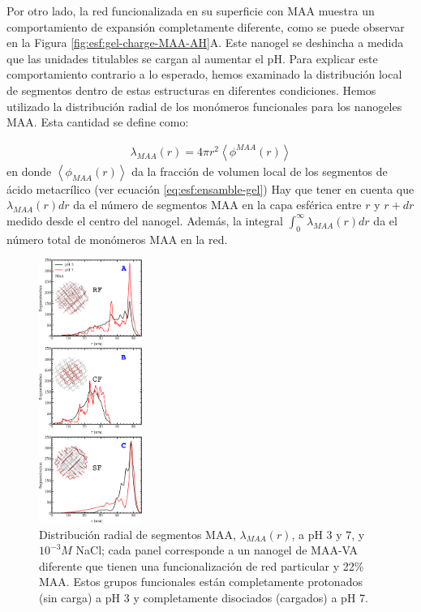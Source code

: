 Por otro lado, la red funcionalizada en su superficie con MAA muestra un comportamiento de expansi\'on completamente diferente, como se puede observar en la Figura \ref{fig:esf:gel-charge-MAA-AH}A. Este nanogel se deshincha a medida que las unidades titulables se cargan al aumentar el pH. Para explicar este comportamiento contrario a lo esperado, hemos examinado la distribuci\'on local de segmentos dentro de estas estructuras en diferentes condiciones. Hemos utilizado la distribuci\'on radial de los mon\'omeros funcionales para los nanogeles MAA. Esta cantidad se define como:



%
\begin{align}
    \lambda_{MAA}(r)= 4\pi r^2\left<\phi^{MAA}(r)\right>
\end{align}
%
\noindent en donde $\left<\phi_{MAA}(r)\right>$ da la fracci\'on de volumen local de los segmentos de \'acido metacr\'ilico (ver ecuaci\'on \ref{eq:esf:ensamble-gel})
Hay que tener en cuenta que $\lambda_{MAA}(r) dr$ da el n\'umero de segmentos MAA en la capa esf\'erica entre $r$ y $r+dr$ medido desde el centro del nanogel.
Adem\'as, la integral $\int_0^\infty \lambda_{MAA}(r) dr$ da el n\'umero total de mon\'omeros MAA en la red.


\begin{figure}[!htb]
     \centering
     \includegraphics[width=0.30\textwidth]{Figures/graphs-gel2/dist-MAA.pdf}
     \caption{Distribuci\'on radial de segmentos MAA, $\lambda_{MAA}(r)$, a pH 3 y 7, y $10^{-3}M$ NaCl; cada panel corresponde a un nanogel de  MAA-VA diferente que tienen una funcionalizaci\'on de red particular y 22\% MAA.
     	Estos grupos funcionales est\'an completamente protonados (sin carga) a pH 3 y completamente disociados (cargados) a pH 7.}
     \label{fig:esf:MAA-vs-r-distribution}
 \end{figure}

